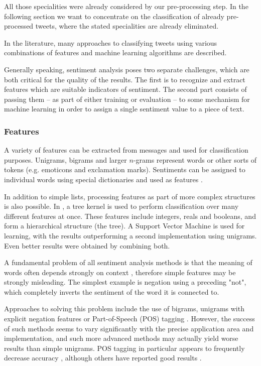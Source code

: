 \documentclass{sig-alternate}
\begin{document}
All those specialities were already considered by our pre-processing step. In the following section we want to concentrate on the classification of already pre-processed tweets, where the stated specialities are already eliminated.



\medskip

In the literature, many approaches to classifying tweets using various combinations of features and machine learning algorithms are described.

Generally speaking, sentiment analysis poses two separate challenges, which are both critical for the quality of the results. The first is to recognize and extract features which are suitable indicators of sentiment. The second part consists of passing them -- as part of either training or evaluation -- to some mechanism for machine learning in order to assign a single sentiment value to a piece of text.


\subsubsection{Features}

A variety of features can be extracted from messages and used for classification purposes. Unigrams, bigrams and larger $n$-grams represent words or other sorts of tokens (e.g. emoticons and exclamation marks). Sentiments can be assigned to individual words using special dictionaries and used as features \cite{kouloumpis2011twitter}.


In addition to simple lists, processing features as part of more complex structures is also possible. In \cite{agarwal2011sentiment}, a tree kernel is used to perform classification over many different features at once. These features include integers, reals and booleans, and form a hierarchical structure (the tree). A Support Vector Machine is used for learning, with the results outperforming a second implementation using unigrams. Even better results were obtained by combining both.


\medskip

A fundamental problem of all sentiment analysis methods is that the meaning of words often depends strongly on context \cite{vinodhini2012sentiment}, therefore simple features may be strongly misleading. The simplest example is negation using a preceding "not", which completely inverts the sentiment of the word it is connected to.

Approaches to solving this problem include the use of bigrams, unigrams with explicit negation features \cite{go2009twitter} or Part-of-Speech (POS) tagging \cite{kouloumpis2011twitter}. However, the success of such methods seems to vary significantly with the precise application area and implementation, and such more advanced methods may actually yield worse results than simple unigrams. POS tagging in particular appears to frequently decrease accuracy \cite{agarwal2011sentiment, kouloumpis2011twitter, go2009twitter}, although others have reported good results \cite{barbosa2010robust}.
\end{document}
